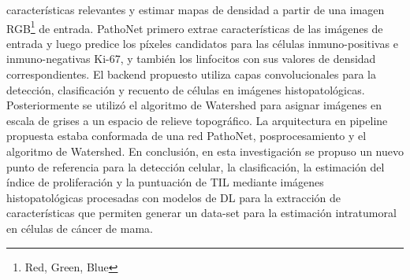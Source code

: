 características relevantes y estimar mapas de densidad a partir de una imagen RGB\footnote{Red, Green, Blue} de entrada. PathoNet primero extrae características de las imágenes de entrada y luego predice los píxeles candidatos para las células inmuno-positivas e inmuno-negativas Ki-67, y también los linfocitos con sus valores de densidad correspondientes. El backend propuesto utiliza capas convolucionales para la detección, clasificación y recuento de células en imágenes histopatológicas. Posteriormente se utilizó el algoritmo de Watershed para asignar imágenes en escala de grises a un espacio de relieve topográfico. La arquitectura en pipeline propuesta estaba conformada de una red PathoNet, posprocesamiento y el algoritmo de Watershed. En conclusión, en esta investigación se propuso un nuevo punto de referencia para la detección celular, la clasificación, la estimación del índice de proliferación y la puntuación de TIL mediante imágenes histopatológicas procesadas con modelos de DL para la extracción de características que permiten generar un data-set para la estimación intratumoral en células de cáncer de mama.
